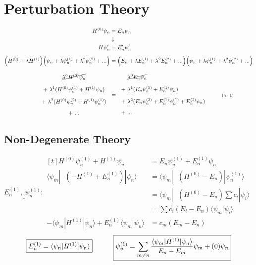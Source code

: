 \documentclass[12pt]{article}
\begin{document}
\section{Perturbation Theory}
\(\begin{aligned}
    H^{(0)} \psi_n &= E_n \psi_n \\
    &\downarrow\\
    H \psi_n' &= E_n' \psi_n'\\[5pt]
    \Big( H^{(0)} + \lambda H^{(1)} \Big) \Big( \psi_n + \lambda \psi_n^{(1)} + \lambda^2 \psi_n^{(2)} + ... \Big) 
        &= \Big( E_n + \lambda E_n^{(1)} + \lambda^2 E_n^{(2)} + ... \Big) 
        \Big( \psi_n + \lambda \psi_n^{(1)} + \lambda^2 \psi_n^{(2)} + ... \Big)\\[10pt]
    \begin{gathered}
        \cancel{ \lambda^0 H^{(0)} \psi_n }\\[5pt]
        + \ \lambda^1 ( H^{(0)} \psi_n^{(1)} + H^{(1)} \psi_n ) \\[5pt]
        + \ \lambda^2 ( H^{(0)} \psi_n^{(2)} + H^{(1)} \psi_n^{(1)}) \\[5pt]
        + \ ...
    \end{gathered} \ \ &= \ \
        \begin{aligned}
            &\cancel{ \lambda^0 E_n \psi_n }\\[5pt]
            + \ &\lambda^1 ( E_n \psi_n^{(1)} + E_n^{(1)} \psi_n ) \\[5pt]
            + \ &\lambda^2 ( E_n \psi_n^{(2)} + E_n^{(1)} \psi_n^{(1)} + E_n^{(2)} \psi_n ) \\[5pt]
            + \ &...
        \end{aligned} \indent\indent {\scriptstyle (\lambda = 1)}
\end{aligned}\)


\subsection{Non-Degenerate Theory}

\vspace{10pt} \noindent
\(\underline{ E_n^{(1)} , \ \psi_n^{(1)} :} \begin{aligned}[t]
    H^{(0)} \psi_n^{(1)} + H^{(1)} \psi_n &= E_n \psi_n^{(1)} + E_n^{(1)} \psi_n \\[10pt]
    \langle \psi_m | \ \ \ ( - H^{(1)} + E_n^{(1)} ) | \psi_n \rangle 
        &= \langle \psi_m | \ \ \ (H^{(0)} - E_n) | \psi_n^{(1)} \rangle \\[5pt]
    &= \langle \psi_m | \ \ \ (H^{(0)} - E_n) \sum c_i | \psi_i \rangle \\
    &= \sum c_i (E_i - E_n) \langle \psi_m | \psi_i \rangle\\
    - \langle \psi_m | H^{(1)} | \psi_n \rangle + E_n^{(1)} \langle \psi_m | \psi_n \rangle 
        &= c_m (E_m - E_n)
\end{aligned}\)\\[10pt]
\[ \boxed{ E_n^{(1)} = \langle \psi_n | H^{(1)} | \psi_n \rangle } \indent \indent 
    \boxed{ \psi_n^{(1)} = \sum_{m \neq n} \frac{\langle \psi_m | H^{(1)} | \psi_n \rangle}{E_n - E_m} \psi_m
    + (0) \psi_n } \]
\end{document}

